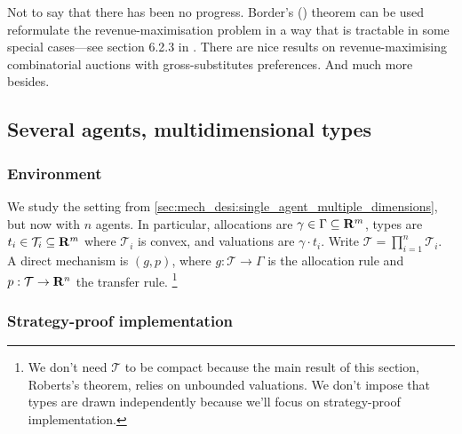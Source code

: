 \documentclass[11pt,letterpaper,reqno,oneside]{article}
\begin{document}
Not to say that there has been no progress. Border's (\citeyear{Border1991}) theorem can be used reformulate the revenue-maximisation problem in a way that is tractable in some special cases---see section 6.2.3 in \textcite{Vohra2011}. There are nice results on revenue-maximising combinatorial auctions with gross-substitutes preferences. And much more besides.



\pagebreak
\subsection{Several agents, multidimensional types}
\label{sec:mech_desi:several_agents_multiple_dimensions}


\subsubsection{Environment}
\label{sec:mech_desi:several_agents_multiple_dimensions:environment}

We study the setting from \cref{sec:mech_desi:single_agent_multiple_dimensions}, but now with $n$ agents. In particular, allocations are $\gamma \in \Gamma \subseteq \mathbf{R}^m$, types are $t_i \in \mathcal{T}_i \subseteq \mathbf{R}^m$ where $\mathcal{T}_i$ is convex, and valuations are $\gamma \cdot t_i$. Write $\mathcal{T} = \prod_{i=1}^n \mathcal{T}_i$. A direct mechanism is $(g,p)$, where $g : \mathcal{T} \to \Gamma$ is the allocation rule and $p : \mathcal{T} \to \mathbf{R}^n$ the transfer rule.%
	\footnote{We don't need $\mathcal{T}$ to be compact because the main result of this section, Roberts's theorem, relies on unbounded valuations. We don't impose that types are drawn independently because we'll focus on strategy-proof implementation.}



\subsubsection{Strategy-proof implementation}
\label{sec:mech_desi:several_agents_multiple_dimensions:strategy-proof}
\end{document}
